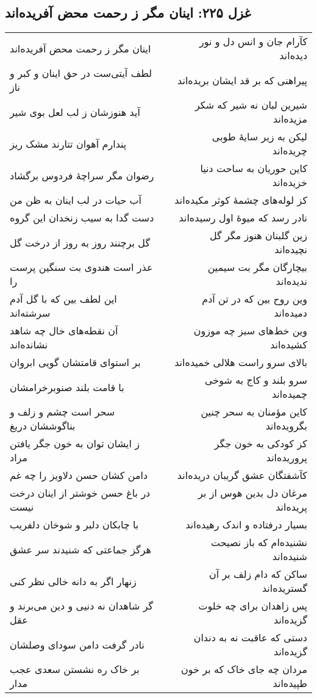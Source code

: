 \begin{center}
\section*{غزل ۲۲۵: اینان مگر ز رحمت محض آفریده‌اند}
\label{sec:225}
\begin{longtable}{l p{0.5cm} r}
اینان مگر ز رحمت محض آفریده‌اند
&&
کآرام جان و انس دل و نور دیده‌اند
\\
لطف آیتی‌ست در حق اینان و کبر و ناز
&&
پیراهنی که بر قد ایشان بریده‌اند
\\
آید هنوزشان ز لب لعل بوی شیر
&&
شیرین لبان نه شیر که شکر مزیده‌اند
\\
پندارم آهوان تتارند مشک ریز
&&
لیکن به زیر سایهٔ طوبی چریده‌اند
\\
رضوان مگر سراچهٔ فردوس برگشاد
&&
کاین حوریان به ساحت دنیا خزیده‌اند
\\
آب حیات در لب اینان به ظن من
&&
کز لوله‌های چشمهٔ کوثر مکیده‌اند
\\
دست گدا به سیب زنخدان این گروه
&&
نادر رسد که میوهٔ اول رسیده‌اند
\\
گل برچنند روز به روز از درخت گل
&&
زین گلبنان هنوز مگر گل نچیده‌اند
\\
عذر است هندوی بت سنگین پرست را
&&
بیچارگان مگر بت سیمین ندیده‌اند
\\
این لطف بین که با گل آدم سرشته‌اند
&&
وین روح بین که در تن آدم دمیده‌اند
\\
آن نقطه‌های خال چه شاهد نشانده‌اند
&&
وین خط‌های سبز چه موزون کشیده‌اند
\\
بر استوای قامتشان گویی ابروان
&&
بالای سرو راست هلالی خمیده‌اند
\\
با قامت بلند صنوبرخرامشان
&&
سرو بلند و کاج به شوخی چمیده‌اند
\\
سحر است چشم و زلف و بناگوششان دریغ
&&
کاین مؤمنان به سحر چنین بگرویده‌اند
\\
ز ایشان توان به خون جگر یافتن مراد
&&
کز کودکی به خون جگر پروریده‌اند
\\
دامن کشان حسن دلاویز را چه غم
&&
کآشفتگان عشق گریبان دریده‌اند
\\
در باغ حسن خوشتر از اینان درخت نیست
&&
مرغان دل بدین هوس از بر پریده‌اند
\\
با چابکان دلبر و شوخان دلفریب
&&
بسیار درفتاده و اندک رهیده‌اند
\\
هرگز جماعتی که شنیدند سر عشق
&&
نشنیده‌ام که باز نصیحت شنیده‌اند
\\
زنهار اگر به دانه خالی نظر کنی
&&
ساکن که دام زلف بر آن گستریده‌اند
\\
گر شاهدان نه دنیی و دین می‌برند و عقل
&&
پس زاهدان برای چه خلوت گزیده‌اند
\\
نادر گرفت دامن سودای وصلشان
&&
دستی که عاقبت نه به دندان گزیده‌اند
\\
بر خاک ره نشستن سعدی عجب مدار
&&
مردان چه جای خاک که بر خون طپیده‌اند
\\
\end{longtable}
\end{center}
